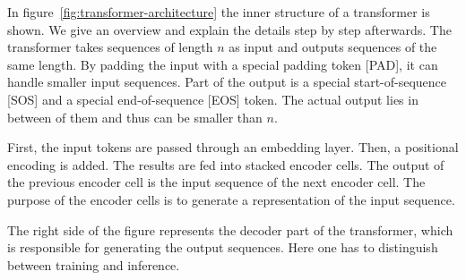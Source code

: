 \documentclass[a4paper]{scrartcl}
\begin{document}
    In figure~\ref{fig:transformer-architecture} the inner structure of a transformer is shown.
    We give an overview and explain the details step by step afterwards.
    The transformer takes sequences of length $n$ as input and outputs sequences of the same length.
    By padding the input with a special padding token [PAD], it can handle smaller input sequences.
    Part of the output is a special start-of-sequence [SOS] and a special end-of-sequence [EOS] token.
    The actual output lies in between of them and thus can be smaller than $n$.

    First, the input tokens are passed through an embedding layer.
    Then, a positional encoding is added.
    The results are fed into stacked encoder cells.
    The output of the previous encoder cell is the input sequence of the next encoder cell.
    The purpose of the encoder cells is to generate a representation of the input sequence.

    The right side of the figure represents the decoder part of the transformer, which is responsible for generating the output sequences.
    Here one has to distinguish between training and inference.
\end{document}
